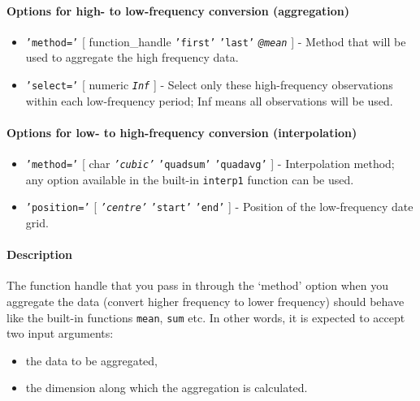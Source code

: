 \paragraph{Options for high- to low-frequency conversion
(aggregation)}\label{options-for-high--to-low-frequency-conversion-aggregation}

\begin{itemize}
\item
  \texttt{'method='} {[} function\_handle \textbar{} \texttt{'first'}
  \textbar{} \texttt{'last'} \textbar{} \emph{\texttt{@mean}} {]} -
  Method that will be used to aggregate the high frequency data.
\item
  \texttt{'select='} {[} numeric \textbar{} \emph{\texttt{Inf}} {]} -
  Select only these high-frequency observations within each
  low-frequency period; Inf means all observations will be used.
\end{itemize}

\paragraph{Options for low- to high-frequency conversion
(interpolation)}\label{options-for-low--to-high-frequency-conversion-interpolation}

\begin{itemize}
\item
  \texttt{'method='} {[} char \textbar{} \emph{\texttt{'cubic'}}
  \textbar{} \texttt{'quadsum'} \textbar{} \texttt{'quadavg'} {]} -
  Interpolation method; any option available in the built-in
  \texttt{interp1} function can be used.
\item
  \texttt{'position='} {[} \emph{\texttt{'centre'}} \textbar{}
  \texttt{'start'} \textbar{} \texttt{'end'} {]} - Position of the
  low-frequency date grid.
\end{itemize}

\paragraph{Description}\label{description}

The function handle that you pass in through the `method' option when
you aggregate the data (convert higher frequency to lower frequency)
should behave like the built-in functions \texttt{mean}, \texttt{sum}
etc. In other words, it is expected to accept two input arguments:

\begin{itemize}
\itemsep1pt\parskip0pt
\item
  the data to be aggregated,
\item
  the dimension along which the aggregation is calculated.
\end{itemize}

